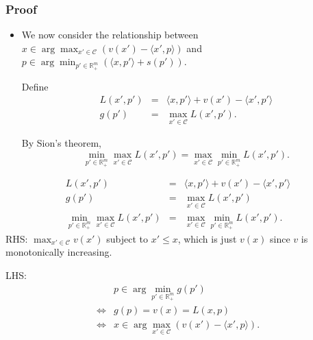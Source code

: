 \documentclass{beamer}
\begin{document}
\begin{frame}
    \frametitle{Proof}
    \begin{itemize}
        \item We now consider the relationship between $x \in \arg\max_{x'\in \mathcal{C}} ( v(x')-\langle x',p\rangle )$ and $p \in \arg\min_{p'\in \mathbb{R}_+^m} ( \langle x,p'\rangle + s(p') )$.

        Define
        \begin{equation}
            \begin{array}{rcl}
                L(x',p') & = & \langle x,p'\rangle+v(x')-\langle x',p'\rangle \\
                g(p') & = & \max_{x'\in \mathcal{C}}L(x',p').
            \end{array}
        \end{equation}

        By Sion's theorem,
        \begin{equation}
            \min_{p'\in \mathbb{R}_+^m}\max_{x'\in \mathcal{C}}L(x',p')=\max_{x'\in \mathcal{C}}\min_{p'\in \mathbb{R}_+^m}L(x',p').
        \end{equation}
    \end{itemize}
\end{frame}

\begin{frame}
    \begin{equation}
        \begin{array}{rcl}
            L(x',p') & = & \langle x,p'\rangle+v(x')-\langle x',p'\rangle \\
            g(p') & = & \max_{x'\in \mathcal{C}}L(x',p') \\
            \displaystyle\min_{p'\in \mathbb{R}_+^m}\max_{x'\in \mathcal{C}}L(x',p') &= & \displaystyle\max_{x'\in \mathcal{C}}\min_{p'\in \mathbb{R}_+^m}L(x',p').
        \end{array}
    \end{equation}
    RHS: $\max_{x'\in \mathcal{C}}v(x')$ subject to $x'\le x$, which is just $v(x)$ since $v$ is monotonically increasing.

    LHS:
    \begin{equation}
        \begin{array}{cl}
             & p\in\arg\min_{p'\in \mathbb{R}_+^m}g(p') \\
            \iff & g(p)=v(x)=L(x,p) \\
            \iff & x \in \arg\max_{x'\in \mathcal{C}} ( v(x')-\langle x',p\rangle ).
        \end{array}
    \end{equation}
\end{frame}
\end{document}
